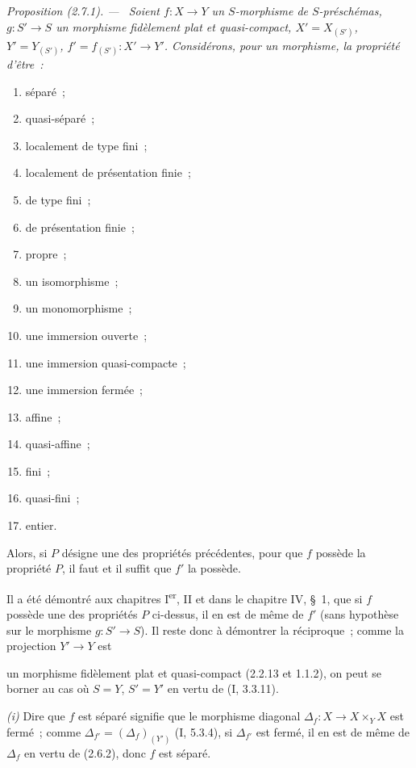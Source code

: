 \documentclass[10pt,oneside]{book}
\newcommand{\oldpage}[2][]{%
  \setcounter{footnote}{0}%
  \marginpar{\scriptsize\textbf{#1}~|~#2}\ignorespaces}
\newenvironment{proposition}[1][]{%
  \par\medskip\noindent\itshape Proposition (#1). ---\ }{\par}
\begin{document}
\begin{proposition}[2.7.1]
\label{IV.2.7.1-fr}
Soient $f:X\to Y$ un $S$-morphisme de $S$-préschémas, $g:S'\to S$ un
morphisme fidèlement plat et quasi-compact, $X'=X_{(S')}$, $Y'=Y_{(S')}$,
$f'=f_{(S')}:X'\to Y'$. Considérons, pour un morphisme, la propriété d'être~:
\begin{enumerate}
\item[(i)] séparé~;
\item[(ii)] quasi-séparé~;
\item[(iii)] localement de type fini~;
\item[(iv)] localement de présentation finie~;
\item[(v)] de type fini~;
\item[(vi)] de présentation finie~;
\item[(vii)] propre~;
\item[(viii)] un isomorphisme~;
\item[(ix)] un monomorphisme~;
\item[(x)] une immersion ouverte~;
\item[(xi)] une immersion quasi-compacte~;
\item[(xii)] une immersion fermée~;
\item[(xiii)] affine~;
\item[(xiv)] quasi-affine~;
\item[(xv)] fini~;
\item[(xvi)] quasi-fini~;
\item[(xvii)] entier.
\end{enumerate}
Alors, si $P$ désigne une des propriétés précédentes, pour que $f$ possède la
propriété $P$, il faut et il suffit que $f'$ la possède.
\end{proposition}

Il a été démontré aux chapitres I\textsuperscript{er}, II et dans le chapitre
IV, \S~1, que si $f$ possède une des propriétés $P$ ci-dessus, il en est de
même de $f'$ (sans hypothèse sur le morphisme $g:S'\to S$). Il reste donc à
démontrer la réciproque~; comme la projection $Y'\to Y$ est

\oldpage[IV-2]{30}
un morphisme fidèlement plat et quasi-compact (2.2.13 et 1.1.2), on peut se
borner au cas où $S=Y$, $S'=Y'$ en vertu de (I, 3.3.11).

\emph{(i)} Dire que $f$ est séparé signifie que le morphisme diagonal
$\Delta_f:X\to X\times_Y X$ est fermé~; comme
$\Delta_{f'}=(\Delta_f)_{(Y')}$ (I, 5.3.4), si $\Delta_{f'}$ est fermé, il
en est de même de $\Delta_f$ en vertu de (2.6.2), donc $f$ est séparé.
\end{document}
